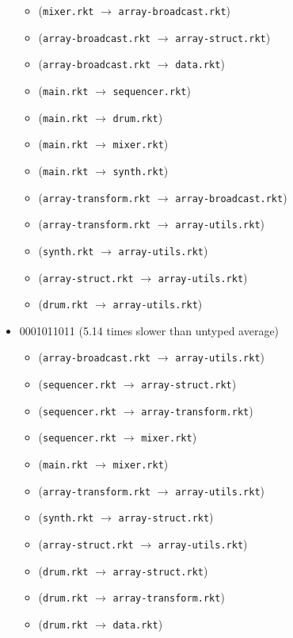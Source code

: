 \documentclass{article}
\newcommand{\mono}[1]{\texttt{#1}}
\begin{document}
\begin{itemize}
\begin{itemize}
  \item (\mono{mixer.rkt} $\rightarrow$ \mono{array-broadcast.rkt})
  \item (\mono{array-broadcast.rkt} $\rightarrow$ \mono{array-struct.rkt})
  \item (\mono{array-broadcast.rkt} $\rightarrow$ \mono{data.rkt})
  \item (\mono{main.rkt} $\rightarrow$ \mono{sequencer.rkt})
  \item (\mono{main.rkt} $\rightarrow$ \mono{drum.rkt})
  \item (\mono{main.rkt} $\rightarrow$ \mono{mixer.rkt})
  \item (\mono{main.rkt} $\rightarrow$ \mono{synth.rkt})
  \item (\mono{array-transform.rkt} $\rightarrow$ \mono{array-broadcast.rkt})
  \item (\mono{array-transform.rkt} $\rightarrow$ \mono{array-utils.rkt})
  \item (\mono{synth.rkt} $\rightarrow$ \mono{array-utils.rkt})
  \item (\mono{array-struct.rkt} $\rightarrow$ \mono{array-utils.rkt})
  \item (\mono{drum.rkt} $\rightarrow$ \mono{array-utils.rkt})
  \end{itemize}
\item 0001011011 (5.14 times slower than untyped average)
  \begin{itemize}
  \item (\mono{array-broadcast.rkt} $\rightarrow$ \mono{array-utils.rkt})
  \item (\mono{sequencer.rkt} $\rightarrow$ \mono{array-struct.rkt})
  \item (\mono{sequencer.rkt} $\rightarrow$ \mono{array-transform.rkt})
  \item (\mono{sequencer.rkt} $\rightarrow$ \mono{mixer.rkt})
  \item (\mono{main.rkt} $\rightarrow$ \mono{mixer.rkt})
  \item (\mono{array-transform.rkt} $\rightarrow$ \mono{array-utils.rkt})
  \item (\mono{synth.rkt} $\rightarrow$ \mono{array-struct.rkt})
  \item (\mono{array-struct.rkt} $\rightarrow$ \mono{array-utils.rkt})
  \item (\mono{drum.rkt} $\rightarrow$ \mono{array-struct.rkt})
  \item (\mono{drum.rkt} $\rightarrow$ \mono{array-transform.rkt})
  \item (\mono{drum.rkt} $\rightarrow$ \mono{data.rkt})

\end{itemize}
\end{itemize}
\end{document}
